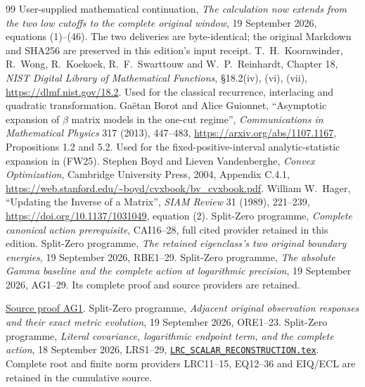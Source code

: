 \documentclass[11pt]{article}
\begin{document}
\begin{thebibliography}{99}
 User-supplied mathematical continuation,
\emph{The calculation now extends from the two low cutoffs to the complete
original window}, 19 September 2026, equations (1)--(46).
The two deliveries are byte-identical; the original Markdown and SHA256
are preserved in this edition's input receipt.
 T.~H.~Koornwinder, R.~Wong, R.~Koekoek,
R.~F.~Swarttouw and W.~P.~Reinhardt, Chapter 18,
\emph{NIST Digital Library of Mathematical Functions},
\S18.2(iv), (vi), (vii), \url{https://dlmf.nist.gov/18.2}.
Used for the classical recurrence, interlacing and quadratic transformation.
 Ga\"etan Borot and Alice Guionnet,
``Asymptotic expansion of $\beta$ matrix models in the one-cut regime'',
\emph{Communications in Mathematical Physics} 317 (2013), 447--483,
\url{https://arxiv.org/abs/1107.1167}, Propositions 1.2 and 5.2.
Used for the fixed-positive-interval analytic-statistic expansion in (FW25).
 Stephen Boyd and Lieven Vandenberghe,
\emph{Convex Optimization}, Cambridge University Press, 2004,
Appendix C.4.1, \url{https://web.stanford.edu/~boyd/cvxbook/bv_cvxbook.pdf}.
 William W.~Hager, ``Updating the Inverse of a Matrix'',
\emph{SIAM Review} 31 (1989), 221--239,
\url{https://doi.org/10.1137/1031049}, equation (2).
 Split-Zero programme, \emph{Complete canonical action
prerequisite}, CAI16--28, full cited provider retained in this edition.
 Split-Zero programme, \emph{The retained eigenclass's two
original boundary energies}, 19 September 2026, RBE1--29.
 Split-Zero programme, \emph{The absolute Gamma baseline and
the complete action at logarithmic precision}, 19 September 2026,
AG1--29. Its complete proof and source providers are retained.

\href{https://github.com/KokunoYumeto/zeta-function-research-reader/blob/5992ad50c0f2a06921f1fcaded7b4e38097c0739/workbenches/splitzero-tandem/continuations/20260920-original-kernel-mixed-determinants/providers/ABSOLUTE_GAMMA_AND_ACTION.tex\#L29}{Source proof AG1}.
 Split-Zero programme, \emph{Adjacent original observation
responses and their exact metric evolution}, 19 September 2026, ORE1--23.
 Split-Zero programme, \emph{Literal covariance, logarithmic
endpoint term, and the complete action}, 18 September 2026, LRS1--29,
\href{https://github.com/KokunoYumeto/zeta-function-research-reader/blob/487253b5b01851da5b9b98af4e146fecf1fab902/workbenches/splitzero-tandem/continuations/20260919-full-window-source-products/providers/LRC_SCALAR_RECONSTRUCTION.tex\#L1}{\texttt{LRC\_SCALAR\_RECONSTRUCTION.tex}}. Complete root and finite norm
providers LRC11--15, EQ12--36 and EIQ/ECL are retained in the cumulative source.


\end{thebibliography}
\end{document}
